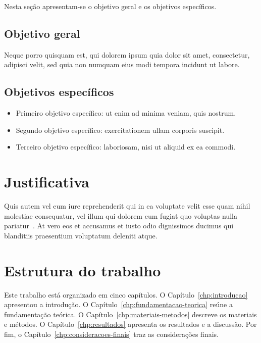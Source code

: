 Nesta seção apresentam-se o objetivo geral e os objetivos específicos.

\subsection{Objetivo geral}

Neque porro quisquam est, qui dolorem ipsum quia dolor sit amet, consectetur,
adipisci velit, sed quia non numquam eius modi tempora incidunt ut labore.

\subsection{Objetivos específicos}

\begin{itemize}
  \item Primeiro objetivo específico: ut enim ad minima veniam, quis nostrum.
  \item Segundo objetivo específico: exercitationem ullam corporis suscipit.
  \item Terceiro objetivo específico: laboriosam, nisi ut aliquid ex ea commodi.
\end{itemize}

\section{Justificativa}

Quis autem vel eum iure reprehenderit qui in ea voluptate velit esse quam nihil
molestiae consequatur, vel illum qui dolorem eum fugiat quo voluptas nulla
pariatur~\parencite{exemplo-livro}. At vero eos et accusamus et iusto odio
dignissimos ducimus qui blanditiis praesentium voluptatum deleniti atque.

\section{Estrutura do trabalho}

Este trabalho está organizado em cinco capítulos. O Capítulo~\ref{chp:introducao}
apresentou a introdução. O Capítulo~\ref{chp:fundamentacao-teorica} reúne a
fundamentação teórica. O Capítulo~\ref{chp:materiais-metodos} descreve os
materiais e métodos. O Capítulo~\ref{chp:resultados} apresenta os resultados e a
discussão. Por fim, o Capítulo~\ref{chp:consideracoes-finais} traz as
considerações finais.

